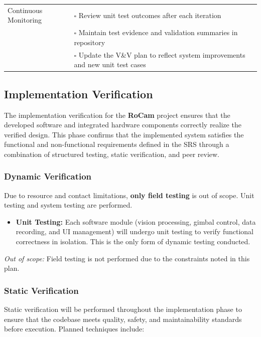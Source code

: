 \documentclass[12pt, titlepage]{article}
\begin{document}
\begin{table}[H]
\begin{tabular}{|p{4.4cm}|p{10.1cm}|}
    Continuous Monitoring          & $\square$ \; Review unit test outcomes after each
    iteration                                                                                                                 \\[-2pt]
                                   & $\square$ \; Maintain test evidence and validation summaries in repository               \\[-2pt]
                                   & $\square$ \; Update the V\&V plan to reflect system improvements and new unit test cases \\ \hline
  \end{tabular}
\end{table}

\subsection{Implementation Verification}

The implementation verification for the \textbf{RoCam} project ensures that the
developed software and integrated hardware components correctly realize the
verified design. This phase confirms that the implemented system satisfies the
functional and non-functional requirements defined in the SRS through a
combination of structured testing, static verification, and peer review.

\subsubsection*{Dynamic Verification}
Due to resource and contact limitations, \textbf{only field testing} is out of
scope. Unit testing and system testing are performed.

\begin{itemize}
  \item \textbf{Unit Testing:}
        Each software module (vision processing, gimbal control, data
        recording, and UI management) will undergo unit testing to verify
        functional correctness in isolation. This is the only form of
        dynamic testing conducted.
\end{itemize}

\noindent\textit{Out of scope:} Field testing is not performed due to the
constraints noted in this plan.

\subsubsection*{Static Verification}
Static verification will be performed throughout the implementation
phase to ensure that the codebase meets quality, safety,
and maintainability standards before execution.
Planned techniques include:
\end{document}
